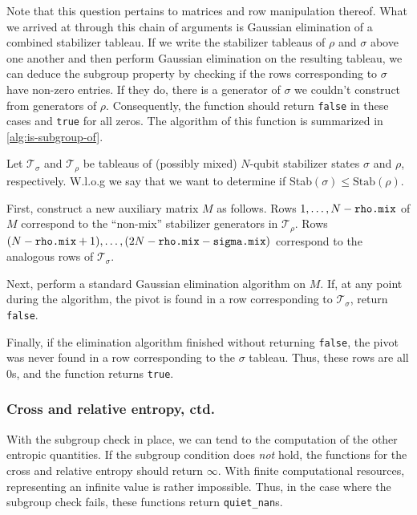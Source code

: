 Note that this question pertains to matrices and row manipulation thereof. What
we arrived at through this chain of arguments is Gaussian elimination of a
combined stabilizer tableau. If we write the stabilizer tableaus of $\rho$ and
$\sigma$ above one another and then perform Gaussian elimination on the
resulting tableau, we can deduce the subgroup property by checking if the rows
corresponding to $\sigma$ have non-zero entries. If they do, there is a
generator of $\sigma$ we couldn't construct from generators of $\rho$.
Consequently, the function should return \verb|false| in these cases and
\verb|true| for all zeros. The algorithm of this function is summarized in
\cref{alg:is-subgroup-of}.
\begin{alg}[Is subgroup of]\label{alg:is-subgroup-of}
  Let $\mathcal{T}_\sigma$ and $\mathcal{T}_\rho$ be tableaus of (possibly
  mixed) $N$-qubit stabilizer states $\sigma$ and $\rho$, respectively. W.l.o.g
  we say that we want to determine if Stab$(\sigma)\leq \mathrm{Stab}(\rho)$.

  First, construct a new auxiliary matrix $M$ as follows. Rows $1, \ldots,
  N-\verb|rho.mix|$ of $M$ correspond to the \enquote{non-mix} stabilizer
  generators in $\mathcal{T}_\rho$. Rows $(N-\verb|rho.mix|+1), \ldots,
  (2N-\verb|rho.mix|-\verb|sigma.mix|)$ correspond to the analogous rows of
  $\mathcal{T}_\sigma$.

  Next, perform a standard Gaussian elimination algorithm on $M$. If, at any
  point during the algorithm, the pivot is found in a row corresponding to
  $\mathcal{T}_\sigma$, return \verb|false|. 

  Finally, if the elimination algorithm finished without returning \verb|false|, the
  pivot was never found in a row corresponding to the $\sigma$ tableau. Thus,
  these rows are all $0$s, and the function returns \verb|true|.
\end{alg}
\subsubsection{Cross and relative entropy, ctd.}
With the subgroup check in place, we can tend to the computation of the other
entropic quantities. If the subgroup condition does \emph{not} hold,
the functions for the cross and relative entropy should return
$\infty$. With finite computational resources, representing an infinite value
is rather impossible. Thus, in the case where the subgroup check fails, these
functions return \verb|quiet_nan|s.

